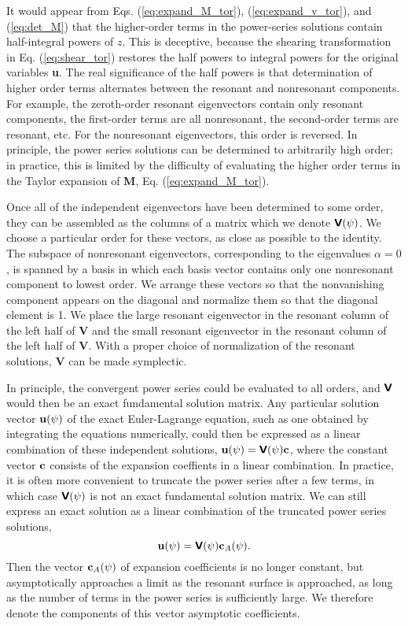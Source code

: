 \documentclass[prb,twocolumn,showpacs,preprintnumbers,amsmath,amssymb]{revtex4}
\renewcommand*{\v}[1]{\hbox{\bfseries #1}}
\renewcommand*{\t}[1]{\hbox{\sffamily\bfseries #1}}
\begin{document}
It would appear from Eqs. (\ref{eq:expand_M_tor}),
(\ref{eq:expand_v_tor}), and (\ref{eq:det_M}) that the higher-order
terms in the power-series solutions contain half-integral powers of $z$.
This is deceptive, because the shearing transformation in
Eq. (\ref{eq:shear_tor}) restores the half powers to integral powers for
the original variables \t{u}.  The real significance of the half powers
is that determination of higher order terms alternates between the
resonant and nonresonant components.  For example, the zeroth-order
resonant eigenvectors contain only resonant components, the first-order
terms are all nonresonant, the second-order terms are resonant, etc.
For the nonresonant eigenvectors, this order is reversed.  In principle,
the power series solutions can be determined to arbitrarily high order;
in practice, this is limited by the difficulty of evaluating the higher
order terms in the Taylor expansion of \t{M},
Eq. (\ref{eq:expand_M_tor}).

Once all of the independent eigenvectors have been determined to some
order, they can be assembled as the columns of a matrix which we denote
$\t{V}(\psi)$.  We choose a particular order for these vectors, as close as
possible to the identity.  The subspace of nonresonant eigenvectors,
corresponding to the eigenvalues $\alpha=0$, is spanned by a basis in
which each basis vector contains only one nonresonant component to
lowest order.  We arrange these vectors so that the nonvanishing
component appears on the diagonal and normalize them so that the
diagonal element is 1.  We place the large resonant eigenvector in the
resonant column of the left half of \t{V} and the small resonant
eigenvector in the resonant column of the left half of \t{V}.  With a
proper choice of normalization of the resonant solutions, \t{V} can be
made symplectic.

In principle, the convergent power series could be evaluated to all
orders, and $\t{V}$ would then be an exact fundamental solution matrix.
Any particular solution vector $\v{u}(\psi)$ of the exact Euler-Lagrange
equation, such as one obtained by integrating the equations numerically,
could then be expressed as a linear combination of these independent
solutions, $\v{u}(\psi) = \t{V}(\psi)\v{c}$, where the constant vector
$\v{c}$ consists of the expansion coeffients in a linear combination.
In practice, it is often more convenient to truncate the power series
after a few terms, in which case $\t{V}(\psi)$ is not an exact
fundamental solution matrix.  We can still express an exact solution as
a linear combination of the truncated power series solutions,
\begin{equation}
\v{u}(\psi) = \t{V}(\psi) \v{c}_A(\psi).
\label{eq:define_ca}
\end{equation}
Then the vector $\v{c}_A(\psi)$ of expansion coefficients is no longer
constant, but asymptotically approaches a limit as the resonant surface
is approached, as long as the number of terms in the power series is
sufficiently large.  We therefore denote the components of this vector
asymptotic coefficients.
\end{document}
